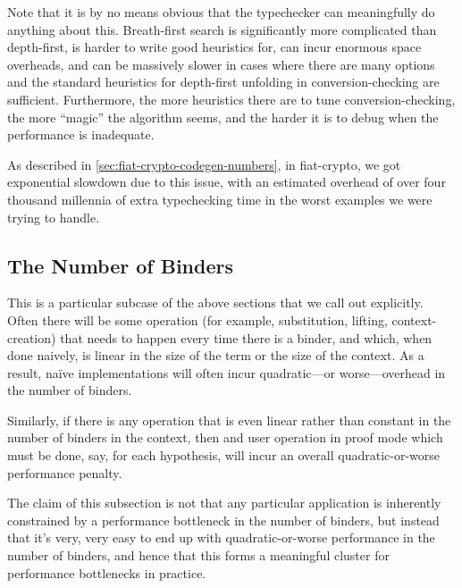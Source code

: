 Note that it is by no means obvious that the typechecker can meaningfully do anything about this.
Breath-first search is significantly more complicated than depth-first, is harder to write good heuristics for, can incur enormous space overheads, and can be massively slower in cases where there are many options and the standard heuristics for depth-first unfolding in conversion-checking are sufficient.
Furthermore, the more heuristics there are to tune conversion-checking, the more ``magic'' the algorithm seems, and the harder it is to debug when the performance is inadequate.

As described in \autoref{sec:fiat-crypto-codegen-numbers}, in fiat-crypto, we got exponential slowdown due to this issue, with an estimated overhead of over four thousand millennia of extra typechecking time in the worst examples we were trying to handle.


\subsection{The Number of Binders} \label{sec:perf:binder-count}

This is a particular subcase of the above sections that we call out explicitly.
Often there will be some operation (for example, substitution, lifting, context-creation) that needs to happen every time there is a binder, and which, when done naively, is linear in the size of the term or the size of the context.
As a result, naïve implementations will often incur quadratic---or worse---overhead in the number of binders.


Similarly, if there is any operation that is even linear rather than constant in the number of binders in the context, then and user operation in proof mode which must be done, say, for each hypothesis, will incur an overall quadratic-or-worse performance penalty.

The claim of this subsection is not that any particular application is inherently constrained by a performance bottleneck in the number of binders, but instead that it's very, very easy to end up with quadratic-or-worse performance in the number of binders, and hence that this forms a meaningful cluster for performance bottlenecks in practice.

